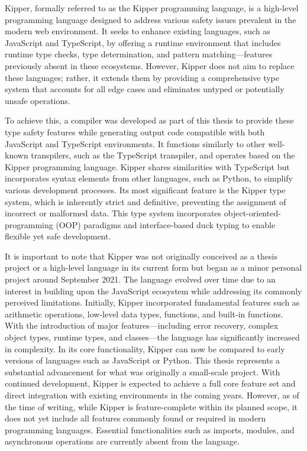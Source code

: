 Kipper, formally referred to as the Kipper programming language, is a high-level programming language designed to address various safety issues prevalent in the modern web environment. It seeks to enhance existing languages, such as JavaScript and TypeScript, by offering a runtime environment that includes runtime type checks, type determination, and pattern matching—features previously absent in these ecosystems. However, Kipper does not aim to replace these languages; rather, it extends them by providing a comprehensive type system that accounts for all edge cases and eliminates untyped or potentially unsafe operations.

To achieve this, a compiler was developed as part of this thesis to provide these type safety features while generating output code compatible with both JavaScript and TypeScript environments. It functions similarly to other well-known \gls{transpiler}s, such as the TypeScript transpiler, and operates based on the Kipper programming language. Kipper shares similarities with TypeScript but incorporates syntax elements from other languages, such as Python, to simplify various development processes. Its most significant feature is the Kipper type system, which is inherently strict and definitive, preventing the assignment of incorrect or malformed data. This type system incorporates \gls{object-oriented-programming} (OOP) paradigms and interface-based duck typing to enable flexible yet safe development.

It is important to note that Kipper was not originally conceived as a thesis project or a high-level language in its current form but began as a minor personal project around September 2021. The language evolved over time due to an interest in building upon the JavaScript ecosystem while addressing its commonly perceived limitations. Initially, Kipper incorporated fundamental features such as arithmetic operations, low-level data types, functions, and built-in functions. With the introduction of major features—including error recovery, complex object types, runtime types, and classes—the language has significantly increased in complexity. In its core functionality, Kipper can now be compared to early versions of languages such as JavaScript or Python. This thesis represents a substantial advancement for what was originally a small-scale project. With continued development, Kipper is expected to achieve a full core feature set and direct integration with existing environments in the coming years. However, as of the time of writing, while Kipper is feature-complete within its planned scope, it does not yet include all features commonly found or required in modern programming languages. Essential functionalities such as imports, modules, and asynchronous operations are currently absent from the language.

